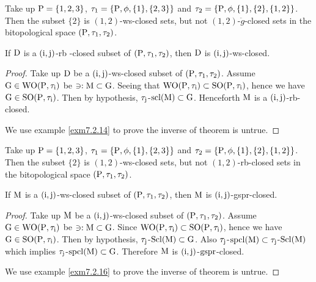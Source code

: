 \begin{exm}\label{exm7.2.12}
Take up $\mathrm{P}= \{1,2,3\}$, $\tau_1 =\{\mathrm{P}, \phi, \{1\}, \{2, 3\}\}$ and $\tau_2 =\{\TSP, \phi, \{1\},\break \{2\}, \{1, 2\}\}$. Then the subset $\{2\}$ is $(1, 2)$-ws-closed sets, but not $(1, 2)$-$\ddot{g}$-closed sets in the bitopological space $(\mathrm{P}, \tau_1, \tau_2 )$.
\end{exm}

\begin{thm}\label{thm7.2.13}
If $\mathrm{D}$ is a $(\mathrm{i}, \mathrm{j})$-rb -closed subset of $(\mathrm{P}, \tau_1, \tau_2 )$, then $\mathrm{D}$ is $(\mathrm{i}, \mathrm{j})$-ws-closed.
\end{thm}

\begin{proof}
Take up $\mathrm{D}$ be a $(\mathrm{i}, \mathrm{j})$-ws-closed subset of $(\mathrm{P}, \tau_1, \tau_2)$. Assume $\mathrm{G}\in\mathrm{W}\mathrm{O}(\mathrm{P}, \tau_{\mathrm{i}})$ be $\ni: \mathrm{M} \subset \mathrm{G}$. Seeing that $\mathrm{W}\mathrm{O}(\mathrm{P}, \tau_{\mathrm{i}} ) \subset \mathrm{S}\mathrm{O}(\mathrm{P}, \tau_{\mathrm{i}})$, hence we have $\mathrm{G}\in\mathrm{S}\mathrm{O}(\mathrm{P}, \tau_{\mathrm{i}})$. Then by hypothesis, $\tau_{\mathrm{j}}$-$\mathrm{scl}(\mathrm{M}) \subset \mathrm{G}$. Henceforth $\mathrm{M}$ is a $(\mathrm{i}, \mathrm{j})$-rb-closed.

We use example \ref{exm7.2.14} to prove the inverse of theorem is untrue.
\end{proof}

\begin{exm}\label{exm7.2.14}
Take up $\mathrm{P}= \{1,2,3\}$, $\tau_1 =\{\mathrm{P}, \phi, \{1\}, \{2, 3\}\}$ and $\tau_2 =\{\TSP, \phi, \{1\},\break \{2\}, \{1, 2\}\}$. Then the subset $\{2\}$ is $(1, 2)$-ws-closed sets, but not $(1, 2)$-rb-closed sets in the bitopological space $(\mathrm{P}, \tau_1, \tau_2 )$.
\end{exm}

\begin{thm}\label{thm7.2.15}
If $\mathrm{M}$ is a $(\mathrm{i}, \mathrm{j})$-ws-closed subset of $(\mathrm{P}, \tau_1, \tau_2 )$, then $\mathrm{M}$ is $(\mathrm{i}, \mathrm{j})$-gspr-closed.
\end{thm}

\begin{proof}
Take up $\mathrm{M}$ be a $(\mathrm{i}, \mathrm{j})$-ws-closed subset of $(\mathrm{P}, \tau_1, \tau_2 )$. Assume $\mathrm{G}\in\mathrm{W}\mathrm{O}(\mathrm{P}, \tau_{\mathrm{i}} )$ be $\ni: \mathrm{M} \subset \mathrm{G}$. Since $\mathrm{W}\mathrm{O}(\mathrm{P}, \tau_{\mathrm{i}} ) \subset \mathrm{S}\mathrm{O}(\mathrm{P}, \tau_{\mathrm{i}} )$, hence we have $\mathrm{G}\in\mathrm{S}\mathrm{O}(\mathrm{P}, \tau_{\mathrm{i}} )$. Then by hypothesis, $\tau_{\mathrm{j}}$-$\mathrm{Scl}(\mathrm{M}) \subset \mathrm{G}$. Also $\tau_{\mathrm{j}}$-$\mathrm{spcl}(\mathrm{M}) \subset \tau_{\mathrm{j}}$-$\mathrm{Scl}(\mathrm{M})$ which implies $\tau_{\mathrm{j}}$-$\mathrm{spcl}(\mathrm{M})\subset \mathrm{G}$. Therefore $\mathrm{M}$ is $(\mathrm{i}, \mathrm{j})$-$\mathrm{gspr}$-closed.

We use example \ref{exm7.2.16} to prove the inverse of theorem is untrue.
\end{proof}

